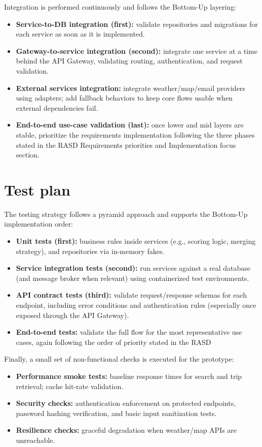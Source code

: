 Integration is performed continuously and follows the Bottom-Up layering:
\begin{itemize}
    \item \textbf{Service-to-DB integration (first):} validate repositories and migrations for each service as soon as it is implemented.
    \item \textbf{Gateway-to-service integration (second):} integrate one service at a time behind the API Gateway, validating routing, authentication, and request validation.
    \item \textbf{External services integration:} integrate weather/map/email providers using adapters; add fallback behaviors to keep core flows usable when external dependencies fail.
    \item \textbf{End-to-end use-case validation (last):} once lower and mid layers are stable, prioritize the requirements implementation following the three phases stated in the RASD Requirements priorities and Implementation focus section.
\end{itemize}

\section{Test plan}
\label{sec:test_plan}%

The testing strategy follows a pyramid approach and supports the Bottom-Up implementation order:
\begin{itemize}
    \item \textbf{Unit tests (first):} business rules inside services (e.g., scoring logic, merging strategy), and repositories via in-memory fakes.
    \item \textbf{Service integration tests (second):} run services against a real database (and message broker when relevant) using containerized test environments.
    \item \textbf{API contract tests (third):} validate request/response schemas for each endpoint, including error conditions and authentication rules (especially once exposed through the API Gateway).
    \item \textbf{End-to-end tests:} validate the full flow for the most representative use cases, again following the order of priority stated in the RASD
\end{itemize}

Finally, a small set of non-functional checks is executed for the prototype:
\begin{itemize}
    \item \textbf{Performance smoke tests:} baseline response times for search and trip retrieval; cache hit-rate validation.
    \item \textbf{Security checks:} authentication enforcement on protected endpoints, password hashing verification, and basic input sanitization tests.
    \item \textbf{Resilience checks:} graceful degradation when weather/map APIs are unreachable.
\end{itemize}

